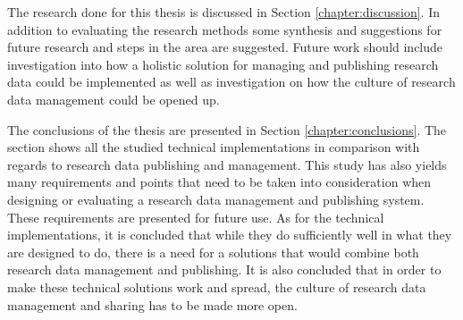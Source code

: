 The research done for this thesis is discussed in Section
\ref{chapter:discussion}. In addition to evaluating the research methods
some synthesis and suggestions for future research and steps in the area
are suggested. Future work should include investigation into how a
holistic solution for managing and publishing research data could be
implemented as well as investigation on how the culture of research data
management could be opened up.

The conclusions of the thesis are presented in Section
\ref{chapter:conclusions}. The section shows all the studied technical
implementations in comparison with regards to research data publishing
and management. This study has also yields many requirements and points
that need to be taken into consideration when designing or evaluating a
research data management and publishing system. These requirements are
presented for future use. As for the technical implementations, it is
concluded that while they do sufficiently well in what they are designed to
do, there is a need for a solutions that would combine both research data
management and publishing. It is also concluded that in order to make these
technical solutions work and spread, the culture of research data management and sharing
has to be made more open.

\iffalse
This is the introduction chapter - it will contain the following things.

\begin{itemize}
    \item general introduction to the subject
    \item general background
    \item objectives for the maste'r thesis
    \item the main research question - how to share research data?
    \begin{itemize}
        \item how to do it?
        \item how is it being done at the moment=
    \end{itemize}
    \item subproblems
    \begin{itemize}
        \item technical
        \item cultural
        \item organizational
    \end{itemize}
    \item what this thesis covers and what it does not cover
    \item positioning the work and how it's connected to other work
    \item important concepts
    \item the structure of the thesis
\end{itemize}
\fi
